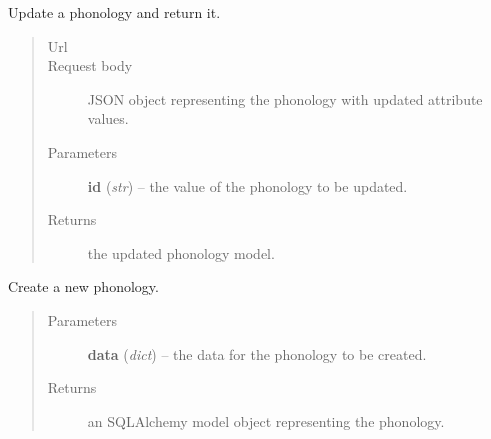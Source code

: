 \documentclass[letterpaper,10pt,english]{sphinxmanual}
\begin{document}
\begin{fulllineitems}
\begin{fulllineitems}
\begin{quote}
\begin{description}
\end{description}\end{quote}

\end{fulllineitems}


\begin{fulllineitems}
\label{api:onlinelinguisticdatabase.controllers.phonologies.PhonologiesController.update}
Update a phonology and return it.
\begin{quote}\begin{description}
\item[{Url }] \leavevmode
{}

\item[{Request body}] \leavevmode
JSON object representing the phonology with updated attribute values.

\item[{Parameters}] \leavevmode
\textbf{id} (\emph{str}) -- the  value of the phonology to be updated.

\item[{Returns}] \leavevmode
the updated phonology model.

\end{description}\end{quote}

\end{fulllineitems}


\end{fulllineitems}


\begin{fulllineitems}
\label{api:onlinelinguisticdatabase.controllers.phonologies.createNewPhonology}
Create a new phonology.
\begin{quote}\begin{description}
\item[{Parameters}] \leavevmode
\textbf{data} (\emph{dict}) -- the data for the phonology to be created.

\item[{Returns}] \leavevmode
an SQLAlchemy model object representing the phonology.

\end{description}\end{quote}

\end{fulllineitems}
\end{document}
